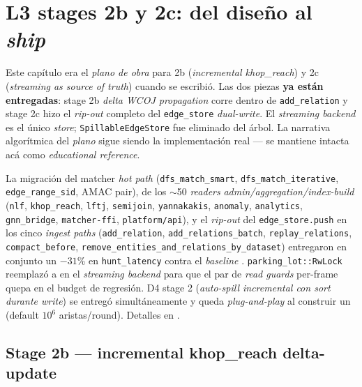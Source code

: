 \chapter{L3 stages 2b y 2c: del diseño al \emph{ship}}
\label{cap:l3-future}

\begin{intuicion}
Este capítulo era el \emph{plano de obra} para 2b (\emph{incremental
khop\_reach}) y 2c (\emph{streaming as source of truth}) cuando se
escribió. Las dos piezas \textbf{ya están entregadas}: stage 2b
\emph{delta WCOJ propagation} corre dentro de \texttt{add\_relation}
y stage 2c hizo el \emph{rip-out} completo del \texttt{edge\_store}
\emph{dual-write}. El \emph{streaming backend} es el único \emph{store};
\texttt{SpillableEdgeStore} fue eliminado del árbol. La narrativa
algorítmica del \emph{plano} sigue siendo la implementación real --- se
mantiene intacta acá como \emph{educational reference}.
\end{intuicion}

\begin{nota}
La migración del matcher \emph{hot path} (\texttt{dfs\_match\_smart},
\texttt{dfs\_match\_iterative}, \texttt{edge\_range\_sid}, AMAC pair),
de los $\sim$50 \emph{readers} \emph{admin/aggregation/index-build}
(\texttt{nlf}, \texttt{khop\_reach}, \texttt{lftj}, \texttt{semijoin},
\texttt{yannakakis}, \texttt{anomaly}, \texttt{analytics},
\texttt{gnn\_bridge}, \texttt{matcher-ffi}, \texttt{platform/api}), y el
\emph{rip-out} del \texttt{edge\_store.push} en los cinco \emph{ingest
paths} (\texttt{add\_relation}, \texttt{add\_relations\_batch},
\texttt{replay\_relations}, \texttt{compact\_before},
\texttt{remove\_entities\_and\_relations\_by\_dataset}) entregaron en
conjunto un \(-31\)\% en \texttt{hunt\_latency} contra el \emph{baseline}
. \texttt{parking\_lot::RwLock} reemplazó a
 en el \emph{streaming backend} para que el par
de \emph{read guards} per-frame quepa en el budget de regresión.
D4 stage 2 (\emph{auto-spill incremental con sort durante write}) se
entregó simultáneamente y queda \emph{plug-and-play} al construir un
 (default \(10^6\) aristas/round). Detalles en
.
\end{nota}

\section{Stage 2b — incremental khop\_reach delta-update}

